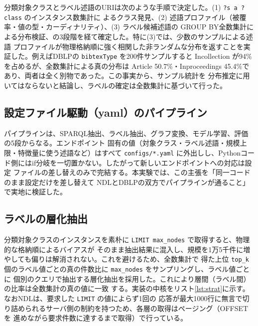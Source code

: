 \documentclass[dvipdfmx,twoside,11pt]{article}
\begin{document}
分類対象クラスとラベル述語のURIは次のような手順で決定した。(1) \texttt{?s a ?class} のインスタンス数集計に
よるクラス発見、(2) 述語プロファイル（被覆率・値の型・カーディナリティ）、(3) ラベル候補述語の
GROUP BY全数集計による分布検証、の3段階を経て確定した。特に(3)では、少数のサンプルによる述語
プロファイルが物理格納順に強く相関した非ランダムな分布を返すことを実証した。例えばDBLPの
\texttt{bibtexType} を200件サンプルすると Incollection が94\%を占めるが、全数集計による真の分布は
Article 50.7\%・Inproceedings 45.4\%であり、両者は全く別物であった。この事実から、サンプル統計を
分布推定に用いてはならないと結論し、ラベルの確定は全数集計に基づいて行った。

\subsection{設定ファイル駆動（yaml）のパイプライン}

パイプラインは、SPARQL抽出、ラベル抽出、グラフ変換、モデル学習、評価の5段からなる。エンドポイント
固有の値（対象クラス・ラベル述語・規模上限・特徴量に使う述語など）はすべて \texttt{configs/*.yaml}
に外出しし、Pythonコード側にはif分岐を一切置かない。したがって新しいエンドポイントへの対応は設定
ファイルの差し替えのみで完結する。本実験では、この主張を「同一コードのまま設定だけを差し替えて
NDLとDBLPの双方でパイプラインが通ること」で実地に検証した。

\subsection{ラベルの層化抽出}

分類対象クラスのインスタンスを素朴に \texttt{LIMIT max\_nodes} で取得すると、物理的な格納順によるバイアスが
そのまま抽出結果に混入し、規模を1万5千件に増やしても偏りは解消されない。これを避けるため、全数集計で
得た上位 \texttt{top\_k} 個のラベル値ごとの真の件数比に \texttt{max\_nodes} をサンプリングし、ラベル値ごとに
個別のクエリで抽出する層化抽出を採用した。これにより層間（ラベル間）の比率は全数集計の真の値に一致
する。実装の中核をリスト\ref{lst:strat}に示す。なおNDLは、要求した \texttt{LIMIT} の値によらず1回の
応答が最大1000行に無言で切り詰められるサーバ側の制約を持つため、各層の取得はページング（OFFSETを
進めながら要求件数に達するまで取得）で行っている。
\end{document}
